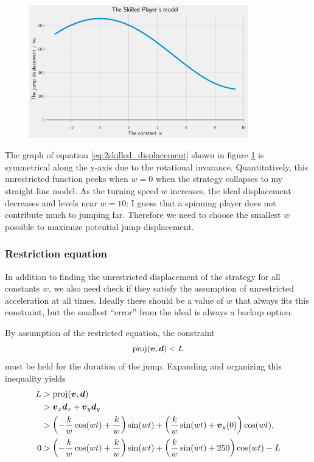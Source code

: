 \begin{figure}[H]
    \centering
    \includegraphics[width=0.85\textwidth]{assets/skilled_displacement.png}
    \caption{}
    \label{fig:skilled_displacement}

\end{figure}
The graph of equation \ref{eq:2skilled_displacement} shown in figure \ref{fig:skilled_displacement} is symmetrical along the y-axis due to the rotational invarance. Quantitatively, this unrestricted function peeks when $w=0$ when the strategy collapses to my straight line model. As the turning speed $w$ increases, the ideal displacement decreases and levels near $w=10$: I guess that a spinning player does not contribute much to jumping far. Therefore we need to choose the smallest $w$ possible to maximize potential jump displacement.

\subsubsection{Restriction equation}
In addition to finding the unrestricted displacement of the strategy for all constants $w$, we also need check if they satisfy the assumption of unrestricted acceleration at all times. Ideally there should be a value of $w$ that always fits this constraint, but the smallest ``error'' from the ideal is always a backup option.

By assumption of the restricted equation, the constraint
\[
    \text{proj}(\boldsymbol{v}, \boldsymbol{d}) < L
\]
must be held for the duration of the jump. Expanding and organizing this inequality yields
\begin{align*}
    L &> \text{proj}(\boldsymbol{v}, \boldsymbol{d})\\
    &> \boldsymbol{v}_x \boldsymbol{d}_x + \boldsymbol{v}_y \boldsymbol{d}_y\\
    &> \left(-\frac{k}{w} \cos(wt) + \frac{k}{w}\right) \sin(wt) + \left(\frac{k}{w} \sin(wt) + \boldsymbol{v}_y(0)\right) \cos(wt),\\
    0 &> \left(-\frac{k}{w} \cos(wt) + \frac{k}{w}\right) \sin(wt) + \left(\frac{k}{w} \sin(wt) + 250\right) \cos(wt) - L
\end{align*}

